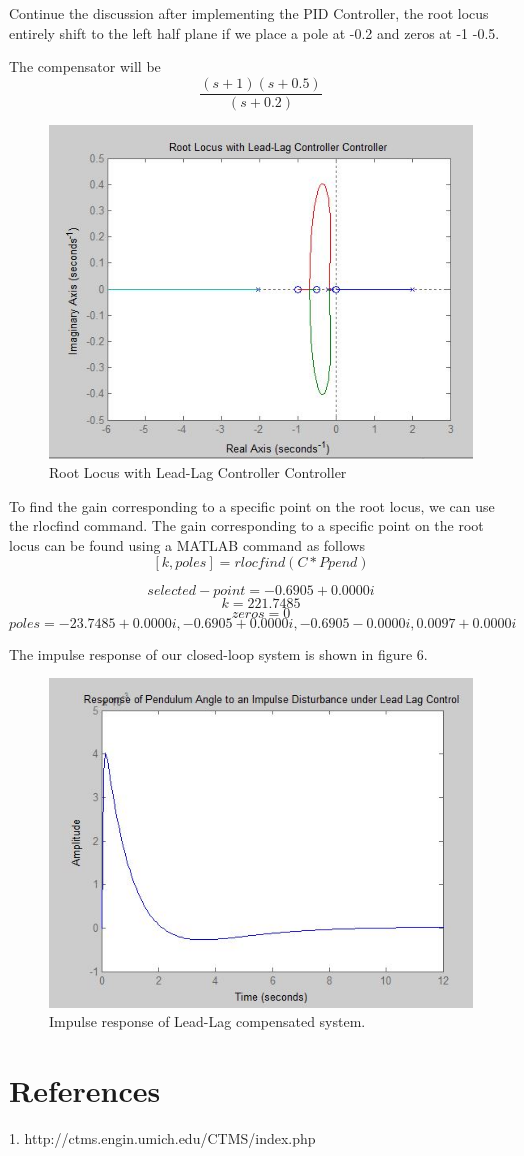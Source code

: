 \documentclass{article}
\begin{document}
Continue the discussion after implementing the PID Controller, the root locus entirely shift to the left half plane if we place a pole at -0.2 and zeros at -1 -0.5.

The compensator will be
\[ \frac{(s+1)(s+0.5)}{(s+0.2)}\]

\begin{figure}[h]
  \includegraphics[width=\linewidth]{fig6.JPG}
  \caption{Root Locus with Lead-Lag Controller Controller}
  \label{fig:boat1}
\end{figure}

To find the gain corresponding to a specific point on the root locus, we can use the rlocfind command.  The  gain corresponding to a specific point on the root locus can be found using a MATLAB command as follows
\[[k,poles] = rlocfind(C*Ppend)\]


\[selected-point = -0.6905 + 0.0000i\]
\[k = 221.7485\]
\[zeros = 0\]
\[poles = -23.7485 + 0.0000i, -0.6905 + 0.0000i, -0.6905 - 0.0000i, 0.0097 + 0.0000i\]

The impulse response of our closed-loop system is shown in figure 6.

\begin{figure}[h]
  \includegraphics[width=\linewidth]{fig5.JPG}
  \caption{Impulse response of Lead-Lag compensated system.}
  \label{fig:boat1}
\end{figure}

\section{References}
    1. http://ctms.engin.umich.edu/CTMS/index.php
\end{document}
